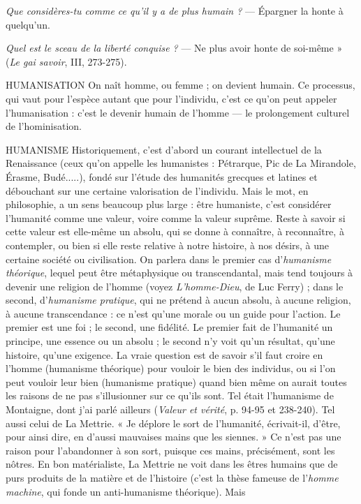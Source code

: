 {\it Que considères-tu comme ce qu'il y a de plus humain ?} — Épargner la honte à
quelqu'un.

{\it Quel est le sceau de la liberté conquise ?} — Ne plus avoir honte de soi-même »
({\it Le gai savoir}, III, 273-275).

HUMANISATION On naît homme, ou femme ; on devient humain. Ce
processus, qui vaut pour l’espèce autant que pour l’individu,
c’est ce qu’on peut appeler l’humanisation : c’est le devenir humain de
l’homme — le prolongement culturel de l’hominisation.

HUMANISME Historiquement, c’est d’abord un courant intellectuel de la
Renaissance (ceux qu’on appelle les humanistes : Pétrarque,
Pic de La Mirandole, Érasme, Budé.....), fondé sur l'étude des humanités
grecques et latines et débouchant sur une certaine valorisation de l’individu.
Mais le mot, en philosophie, a un sens beaucoup plus large : être humaniste,
c'est considérer l’humanité comme une valeur, voire comme la valeur suprême.
Reste à savoir si cette valeur est elle-même un absolu, qui se donne à connaître,
à reconnaître, à contempler, ou bien si elle reste relative à notre histoire, à nos
désirs, à une certaine société ou civilisation. On parlera dans le premier cas
d’{\it humanisme théorique}, lequel peut être métaphysique ou transcendantal, mais
tend toujours à devenir une religion de l’homme (voyez {\it L'homme-Dieu}, de Luc
Ferry) ; dans le second, d’{\it humanisme pratique}, qui ne prétend à aucun absolu,
à aucune religion, à aucune transcendance : ce n’est qu’une morale ou un guide
pour l’action. Le premier est une foi ; le second, une fidélité. Le premier fait de
l’humanité un principe, une essence ou un absolu ; le second n’y voit qu’un
résultat, qu’une histoire, qu’une exigence. La vraie question est de savoir s’il
faut croire en l’homme (humanisme théorique) pour vouloir le bien des individus,
ou si l’on peut vouloir leur bien (humanisme pratique) quand bien
même on aurait toutes les raisons de ne pas s’illusionner sur ce qu’ils sont. Tel
était l’humanisme de Montaigne, dont j’ai parlé ailleurs ({\it Valeur et vérité}, p. 94-95
et 238-240). Tel aussi celui de La Mettrie. « Je déplore le sort de l'humanité,
écrivait-il, d’être, pour ainsi dire, en d’aussi mauvaises mains que les siennes. »
Ce n’est pas une raison pour l’abandonner à son sort, puisque ces mains, précisément,
sont les nôtres. En bon matérialiste, La Mettrie ne voit dans les êtres
humains que de purs produits de la matière et de l’histoire (c’est la thèse
fameuse de l’{\it homme machine}, qui fonde un anti-humanisme théorique). Mais
